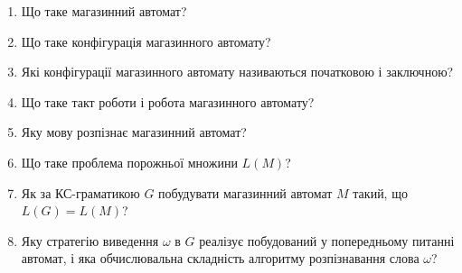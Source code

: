 \begin{enumerate}
	\item Що таке магазинний автомат? %
	\item Що таке конфігурація магазинного автомату? %
	\item Які конфігурації магазинного автомату називаються початковою і заключною? %
	\item Що таке такт роботи і робота магазинного автомату? %
	\item Яку мову розпізнає магазинний автомат? %
	\item Що таке проблема порожньої множини $L(M)$? %
	\item Як за КС-граматикою $G$ побудувати магазинний автомат $M$ такий, що $L(G) = L(M)$?
	\item Яку стратегію виведення $\omega$ в $G$ реалізує побудований у попередньому питанні автомат, і яка обчислювальна складність алгоритму розпізнавання слова $\omega$? %
\end{enumerate}